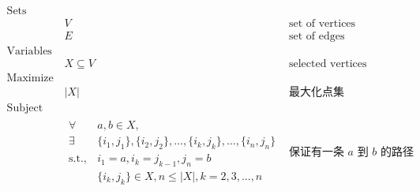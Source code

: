 \documentclass[11pt]{article}
\begin{document}
\begin{eqnarray*}
    \textrm{Sets} \\
        & V & \textrm{set of vertices} \\
        & E & \textrm{set of edges} \\
    \textrm{Variables} \\
        & X \subseteq V & \textrm{selected vertices} \\
    \textrm{Maximize} \\
        & \displaystyle |X| & \textrm{最大化点集} \\
    \textrm{Subject to} \\ 
        & \begin{array}{rl}
            \forall & a, b \in X, \\
            \exists & \{i_1, j_1\}, \{i_2, j_2\}, ..., \{i_k, j_k\}, ..., \{i_n, j_n\} \\
            \mathrm{s.t.,} & i_1 = a, i_k = j_{k-1}, j_n = b \\
                    & \{i_k, j_k\} \in X, n \leq |X|, k = 2, 3, ..., n
        \end{array} & \textrm{保证有一条 $a$ 到 $b$ 的路径} \\ 
\end{eqnarray*}
\end{document}
